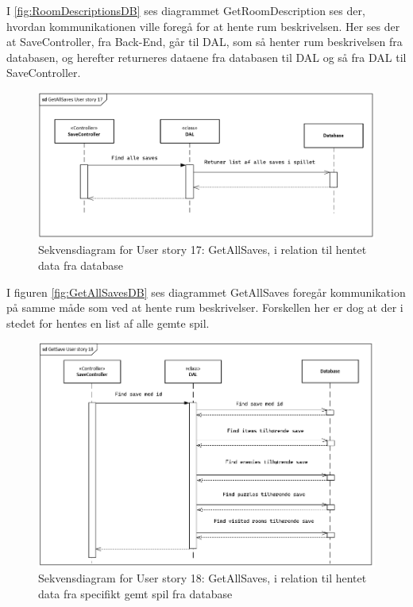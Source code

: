I \autoref{fig:RoomDescriptionsDB} ses diagrammet GetRoomDescription ses der, hvordan kommunikationen ville foregå for at hente rum beskrivelsen. Her ses der at SaveController, fra Back-End, går til DAL, som så henter rum beskrivelsen fra databasen, og herefter returneres dataene fra databasen til DAL og så fra DAL til SaveController.

\begin{figure}[H]
\centering
\includegraphics[width = \textwidth]{02-Body/Images/GetAllSavesDB.PNG}
\caption{Sekvensdiagram for User story 17: GetAllSaves, i relation til hentet data fra database}
\label{fig:GetAllSavesDB}
\end{figure}

I figuren \autoref{fig:GetAllSavesDB} ses diagrammet GetAllSaves foregår kommunikation på samme måde som ved at hente rum beskrivelser. Forskellen her er dog at der i stedet for hentes en list af alle gemte spil.

\begin{figure}[H]
\centering
\includegraphics[width = \textwidth]{02-Body/Images/GetSaveDB.PNG}
\caption{Sekvensdiagram for User story 18: GetAllSaves, i relation til hentet data fra specifikt gemt spil fra database}
\label{fig:GetSaveDB}
\end{figure}

